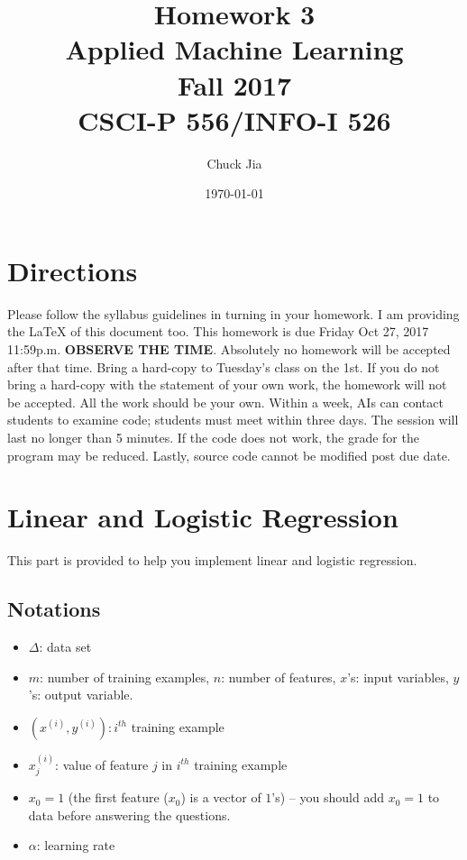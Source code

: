 \documentclass[a4paper,12pt]{article}
\begin{document}
\title{Homework 3\\ Applied Machine Learning \\ Fall 2017\\ CSCI-P 556/INFO-I 526}         %
\author{Chuck Jia}        %
\date{\today}          %
\maketitle
\makeatother     %
\pagestyle{plain}
\section*{Directions}
Please follow the syllabus guidelines in turning in your homework.  I am providing the \LaTeX{} of this document too. This homework is due Friday Oct 27, 2017 11:59p.m. \textbf{OBSERVE THE  TIME}. Absolutely no homework will be accepted after that time. Bring a hard-copy to Tuesday's class on the 1st.
If you do not bring a hard-copy with the statement of your own work, the homework will not be
accepted.  All the work should be your own.  Within a week, AIs can contact students to examine code; students must meet within three days.  The session will last no longer than 5 minutes.  If the code does not work, the grade for the program may be reduced.  Lastly, source code cannot be
 modified post due date.
 

 
 
\section*{Linear  and Logistic Regression} 
This part is provided to help you implement linear and logistic regression.

\subsection*{Notations} 


\begin{itemize}
\item $\Delta$: data set
\item $m$: number of training examples, $n$: number of features, $x$'s:  input variables, $y$'s:  output variable.
\item     $(x^{(i)}, y^{(i)}): i^{th}$ training example
\item $x^{(i)}_j$: value of feature $j$ in $i^{th}$ training example
\item $x_0 = 1$ (the first feature ($x_0$) is a vector of $1$'s) -- you should add  $x_0 = 1$  to data before answering the questions.
\item  $\alpha$: learning rate 
\end{itemize}
\end{document}

